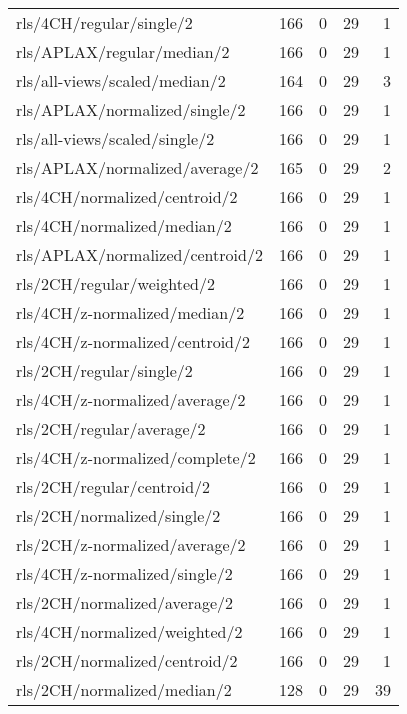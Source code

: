 \begin{longtable}{lrrrr}
    rls/4CH/regular/single/2                  & 166 &  0 & 29 &  1 \\
    rls/APLAX/regular/median/2                & 166 &  0 & 29 &  1 \\
    rls/all-views/scaled/median/2             & 164 &  0 & 29 &  3 \\
    rls/APLAX/normalized/single/2             & 166 &  0 & 29 &  1 \\
    rls/all-views/scaled/single/2             & 166 &  0 & 29 &  1 \\
    rls/APLAX/normalized/average/2            & 165 &  0 & 29 &  2 \\
    rls/4CH/normalized/centroid/2             & 166 &  0 & 29 &  1 \\
    rls/4CH/normalized/median/2               & 166 &  0 & 29 &  1 \\
    rls/APLAX/normalized/centroid/2           & 166 &  0 & 29 &  1 \\
    rls/2CH/regular/weighted/2                & 166 &  0 & 29 &  1 \\
    rls/4CH/z-normalized/median/2             & 166 &  0 & 29 &  1 \\
    rls/4CH/z-normalized/centroid/2           & 166 &  0 & 29 &  1 \\
    rls/2CH/regular/single/2                  & 166 &  0 & 29 &  1 \\
    rls/4CH/z-normalized/average/2            & 166 &  0 & 29 &  1 \\
    rls/2CH/regular/average/2                 & 166 &  0 & 29 &  1 \\
    rls/4CH/z-normalized/complete/2           & 166 &  0 & 29 &  1 \\
    rls/2CH/regular/centroid/2                & 166 &  0 & 29 &  1 \\
    rls/2CH/normalized/single/2               & 166 &  0 & 29 &  1 \\
    rls/2CH/z-normalized/average/2            & 166 &  0 & 29 &  1 \\
    rls/4CH/z-normalized/single/2             & 166 &  0 & 29 &  1 \\
    rls/2CH/normalized/average/2              & 166 &  0 & 29 &  1 \\
    rls/4CH/normalized/weighted/2             & 166 &  0 & 29 &  1 \\
    rls/2CH/normalized/centroid/2             & 166 &  0 & 29 &  1 \\
    rls/2CH/normalized/median/2               & 128 &  0 & 29 & 39 \\

\end{longtable}
